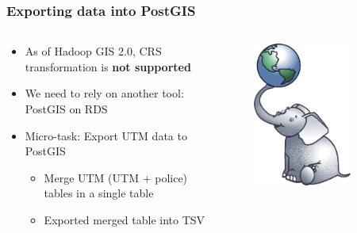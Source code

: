 \documentclass[hyperref={pdfpagelabels=true}]{beamer}
\begin{document}
\begin{frame}
\frametitle{Exporting data into PostGIS}
\begin{columns}
  \begin{column}{0.5\textwidth}
    \begin{itemize}
      \item<1->As of Hadoop GIS 2.0, CRS transformation is \textbf{not supported}
      \item<1->We need to rely on another tool: PostGIS on RDS  
      \item<1->Micro-task: Export UTM data to PostGIS
      \begin{itemize}
	\item<2->Merge UTM (UTM + police) tables in a single table
	\item<3->Exported merged table into TSV
      \end{itemize}
    \end{itemize}
  \end{column}  
  \begin{column}{0.5\textwidth}
      \begin{figure}  
	\includegraphics[width=0.8\textwidth]{postgis.png}	
       \end{figure}  
  \end{column}  
\end{columns}        
\end{frame}
\end{document}
